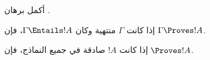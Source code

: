\documentclass[../../../include/open-logic-section]{subfiles}
\begin{document}
\begin{prob}
أكمل برهان .
\end{prob}

\begin{cor}
إذا كانت $\Gamma$ منتهية وكان $\Gamma \Entails !A$، فإن
$\Gamma \Proves !A$.
\end{cor}

\begin{cor}
إذا كانت $!A$ صادقة في جميع النماذج، فإن $\Proves !A$.
\end{cor}
\end{document}
